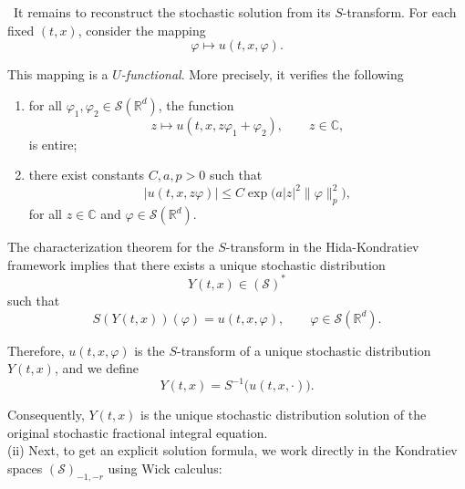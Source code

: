 \documentclass[12pt]{article}%
\numberwithin{equation}{section}
\def\S{\mathcal{S}}
\begin{document}
\
It remains to reconstruct the stochastic solution from its
$S$-transform. For each fixed $(t,x)$, consider the mapping
\[
\varphi \longmapsto u(t,x,\varphi).
\]

This mapping is a
\emph{$U$-functional}. More precisely, it verifies the following
\begin{enumerate}
\item for all $\varphi_1,\varphi_2 \in \mathcal{S}(\mathbb{R}^d)$, the function
\[
z \longmapsto u(t,x,z\varphi_1+\varphi_2),
\qquad z\in\mathbb{C},
\]
is entire;

\item there exist constants $C,a,p>0$ such that
\[
|u(t,x,z\varphi)|
\le
C\exp\!\big(a|z|^2\|\varphi\|_p^2\big),
\]
for all $z\in\mathbb{C}$ and $\varphi\in\mathcal{S}(\mathbb{R}^d)$.
\end{enumerate}

The characterization
theorem for the $S$-transform in the Hida-Kondratiev framework
 implies that there exists a unique
stochastic distribution
\[
Y(t,x)\in (\mathcal{S})^{*}
\]
such that
\[
S(Y(t,x))(\varphi)
=
u(t,x,\varphi),
\qquad
\varphi\in\mathcal{S}(\mathbb{R}^d).
\]

Therefore, $u(t,x,\varphi)$ is the $S$-transform of a unique stochastic
distribution $Y(t,x)$, and we define
\[
Y(t,x)
=
S^{-1}\big(u(t,x,\cdot)\big).
\]

Consequently, $Y(t,x)$ is the unique stochastic distribution solution
of the original stochastic fractional integral equation.\\

(ii)
Next, to get an explicit solution formula, we work directly in the Kondratiev spaces $(\S)_{-1,-r}$ using Wick calculus: \\
\end{document}
